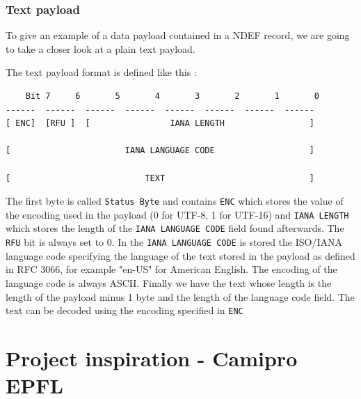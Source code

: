 \documentclass[11pt,a4paper]{report}
\begin{document}
\subsubsection{Text payload}
To give an example of a data payload contained in a NDEF record, we are going to take a closer look at a plain text payload.

The text payload format is defined like this\cite{nfc:ndef:doc:text_record} :
\begin{verbatim}
	Bit 7     6       5       4       3       2       1       0
------  ------  ------  ------  ------  ------  ------  ------ 
[ ENC]  [RFU ]  [                IANA LENGTH                 ]  

[                       IANA LANGUAGE CODE                   ]

[                           TEXT                             ]
\end{verbatim}
The first byte is called \verb+Status Byte+ and contains \verb+ENC+ which stores the value of the encoding used in the payload (0 for UTF-8, 1 for UTF-16) and \verb+IANA LENGTH+ which stores the length of the \verb+IANA LANGUAGE CODE+ field found afterwards. The \verb+RFU+ bit is always set to 0. In the \verb+IANA LANGUAGE CODE+ is stored the ISO/IANA language code specifying the language of the text stored in the payload as defined in RFC 3066\cite{rfc:language}, for example "en-US" for American English. The encoding of the language code is always ASCII. Finally we have the text whose length is the length of the payload minus 1 byte and the length of the language code field. The text can be decoded using the encoding specified in \verb+ENC+

\section{Project inspiration - Camipro EPFL}
\end{document}
